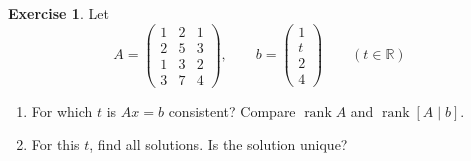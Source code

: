 \documentclass[12pt]{article}
\newcommand{\R}{\mathbb R}
\DeclareMathOperator{\rank}{rank}
\theoremstyle{definition}
\newtheorem{exercise}{Exercise}
\begin{document}
\begin{exercise}\label{r4-dr-consistency}
Let
\[
A=\begin{pmatrix}1&2&1\\2&5&3\\1&3&2\\3&7&4\end{pmatrix},\qquad b=\begin{pmatrix}1\\t\\2\\4\end{pmatrix}\qquad(t\in\R)
\]
\begin{enumerate}
\item For which \(t\) is \(Ax=b\) consistent? Compare \(\rank A\) and \(\rank[A\mid b]\).
\item For this \(t\), find all solutions. Is the solution unique?
\end{enumerate}
\end{exercise}
\end{document}
